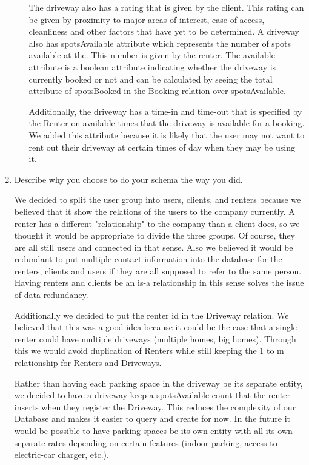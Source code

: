 \documentclass[a4paper]{article}
\begin{document}
\begin{enumerate}
\begin{itemize}
The driveway also has a rating that is given by the client. This rating can be given by proximity to major areas of interest, ease of access, cleanliness and other factors that have yet to be determined. A driveway also has spotsAvailable 
attribute which represents the number of spots available at the. This number is given by the renter. The available attribute is a boolean attribute indicating whether the driveway is currently booked or not and can be calculated by seeing the total attribute of spotsBooked in the Booking relation over spotsAvailable. 

Additionally, the driveway has a time-in and time-out that is specified by the Renter on available times that the driveway is available for a booking. We added this attribute because it is likely that the user may not want to rent out their driveway at certain times of day when they may be using it. 
\end{itemize}
\item Describe why you choose to do your schema the way you did.

We decided to split the user group into users, clients, and renters because we believed that it show the relations of the users to the company currently. A renter has a different "relationship" to the company than a client does, so we thought it would be appropriate to divide the three groups. Of course, they are all still users and connected in that sense. Also we believed it would be redundant to put multiple contact information into the database for the renters, clients and users if they are all supposed to refer to the same person. Having renters and clients be an is-a relationship in this sense solves the issue of data redundancy. 

Additionally we decided to put the renter id in the Driveway relation. We believed that this was a good idea because it could be the case that a single renter could have multiple driveways (multiple homes, big homes). Through this we would avoid duplication of Renters while still keeping the 1 to m relationship for Renters and Driveways. 

Rather than having each parking space in the driveway be its separate entity, we decided to have a driveway keep a spotsAvailable count that the renter inserts when they register the Driveway. This reduces the complexity of our Database and makes it easier to query and create for now. In the future it would be possible to have parking spaces be its own entity with all its own separate rates depending on certain features (indoor parking, access to electric-car charger, etc.).


\end{enumerate}
\end{document}
